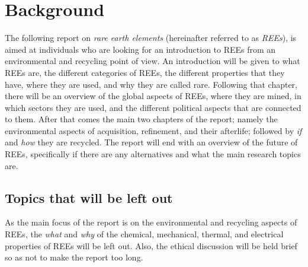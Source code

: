 \section{Background}

The following report on \textit{rare earth elements} (hereinafter referred to as \textit{REEs}), is aimed at individuals who are looking for an introduction to REEs from an environmental and recycling point of view. An introduction will be given to what REEs are, the different categories of REEs, the different properties that they have, where they are used, and why they are called rare. Following that chapter, there will be an overview of the global aspects of REEs, where they are mined, in which sectors they are used, and the different political aspects that are connected to them. After that comes the main two chapters of the report; namely the environmental aspects of acquisition, refinement, and their afterlife; followed by \textit{if} and \textit{how} they are recycled. The report will end with an overview of the future of REEs, specifically if there are any alternatives and what the main research topics are.

\subsection{Topics that will be left out}

As the main focus of the report is on the environmental and recycling aspects of REEs, the \textit{what} and \textit{why} of the chemical, mechanical, thermal, and electrical properties of REEs will be left out. Also, the ethical discussion will be held brief so as not to make the report too long.